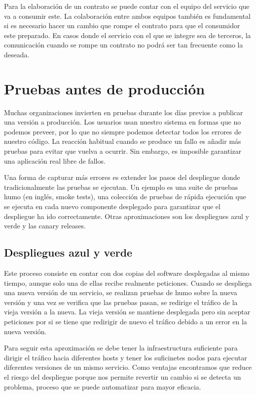 \documentclass[11pt,a4paper]{article}
\begin{document}
Para la elaboración de un contrato se puede contar con el equipo del servicio que va a consumir este. La colaboración entre ambos equipos también es fundamental si es necesario hacer un cambio que rompe el contrato para que el consumidor este preparado. En casos donde el servicio con el que se integre sea de terceros, la comunicación cuando se rompe un contrato no podrá ser tan frecuente como la deseada.

\section{Pruebas antes de producción}

Muchas organizaciones invierten en pruebas durante los días previos a publicar una versión a producción. Los usuarios usan nuestro sistema en formas que no podemos preveer, por lo que no siempre podemos detectar todos los errores de nuestro código. La reacción habitual cuando se produce un fallo es añadir más pruebas para evitar que vuelva a ocurrir. Sin embargo, es imposible garantizar una aplicación real libre de fallos.

Una forma de capturar más errores es extender los pasos del despliegue donde tradicionalmente las pruebas se ejecutan. Un ejemplo es una suite de pruebas humo (en inglés, smoke tests), una colección de pruebas de rápida ejecución que se ejecuta en cada nuevo componente desplegado para garantizar que el despliegue ha ido correctamente. Otras aproximaciones son los despliegues azul y verde y las canary releases.

\subsection{Despliegues azul y verde}

Este proceso consiste en contar con dos copias del software desplegadas al mismo tiempo, aunque solo una de ellas recibe realmente peticiones. Cuando se despliega una nueva versión de un servicio, se realizan pruebas de humo sobre la nueva versión y una vez se verifica que las pruebas pasan, se redirige el tráfico de la vieja versión a la nueva. La vieja versión se mantiene desplegada pero sin aceptar peticiones por si se tiene que redirigir de nuevo el tráfico debido a un error en la nueva versión.

Para seguir esta aproximación se debe tener la infraestructura suficiente para dirigir el tráfico hacia diferentes hosts y tener los suficinetes nodos para ejecutar diferentes versiones de un mismo servicio. Como ventajas encontramos que reduce el riesgo del despliegue porque nos permite revertir un cambio si se detecta un problema, proceso que se puede automatizar para mayor eficacia.
\end{document}
